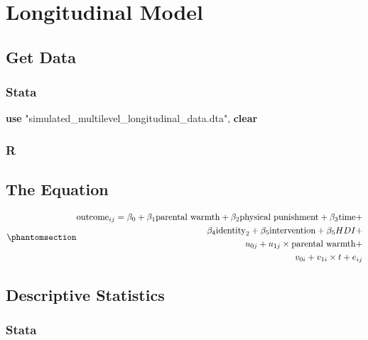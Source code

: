 \documentclass[
  letterpaper,
  DIV=11,
  numbers=noendperiod]{scrreprt}
\newenvironment{Shaded}{\begin{snugshade}}{\end{snugshade}}
\newcommand{\KeywordTok}[1]{\textcolor[rgb]{0.00,0.23,0.31}{\textbf{#1}}}
\newcommand{\NormalTok}[1]{\textcolor[rgb]{0.00,0.23,0.31}{#1}}
\newcommand{\StringTok}[1]{\textcolor[rgb]{0.13,0.47,0.30}{#1}}
\begin{document}
\section{Longitudinal Model}\label{longitudinal-model}

\subsection{Get Data}\label{get-data-1}

\subsubsection{Stata}

\begin{Shaded}
\begin{Highlighting}[]

\KeywordTok{use} \StringTok{"simulated\_multilevel\_longitudinal\_data.dta"}\NormalTok{, }\KeywordTok{clear}
\end{Highlighting}
\end{Shaded}

\subsubsection{R}

\subsection{The Equation}\label{the-equation-1}

\begin{equation}\protect\phantomsection\label{eq-longitudinal}{\begin{aligned}
\text{outcome}_{ij} = \beta_0 + \beta_1 \text{parental warmth} + \beta_2 \text{physical punishment} + \beta_3 \text{time} + \\
\beta_4 \text{identity}_2 + \beta_5 \text{intervention} + \beta_5 HDI + \\
u_{0j} + u_{1j} \times \text{parental warmth} + \\
v_{0i} + v_{1i} \times t + e_{ij} 
\end{aligned}}\end{equation}

\subsection{Descriptive Statistics}\label{descriptive-statistics-1}

\subsubsection{Stata}
\end{document}
